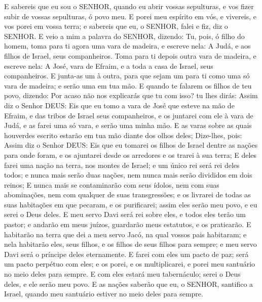 {  E sabereis que eu sou o SENHOR, quando eu abrir vossas sepulturas, e vos fizer subir de vossas sepulturas, ó povo meu.
  E porei meu espírito em vós, e vivereis, e vos porei em vossa terra; e sabereis que eu, o SENHOR, falei e fiz, diz o SENHOR.
  E veio a mim a palavra do SENHOR, dizendo:
  Tu, pois, ó filho do homem, toma para ti agora uma vara de madeira, e escreve nela: A Judá, e aos filhos de Israel, seus companheiros. Toma para ti depois outra vara de madeira, e escreve nela: A José, vara de Efraim, e a toda a casa de Israel, seus companheiros.
  E junta-as um à outra, para que sejam um para ti como uma só vara de madeira; e serão uma em tua mão.
  E quando te falarem os filhos de teu povo, dizendo: Por acaso não nos explicarás que tu
{} com isso?
   tu lhes dirás: Assim diz o Senhor DEUS: Eis que eu tomo a vara de José que esteve na mão de Efraim, e das tribos de Israel seus companheiros, e os juntarei com ele à vara de Judá, e as farei uma só vara, e serão uma minha mão.
  E as varas sobre as quais houverdes escrito estarão em tua mão diante dos olhos deles;
  Dize-lhes, pois: Assim diz o Senhor DEUS: Eis que eu tomarei os filhos de Israel dentre as nações para onde foram, e os ajuntarei desde os arredores e os trarei à sua
{} terra;
  E deles farei uma nação na terra, nos montes de Israel; e um único rei será rei deles todos; e nunca mais serão duas nações, nem nunca mais serão divididos em dois reinos;
  E nunca mais se contaminarão com seus ídolos, nem com suas abominações, nem com qualquer de suas transgressões; e os livrarei de todas as suas habitações em que pecaram, e os purificarei; assim eles serão meu povo, e eu serei o Deus deles.
  E meu servo Davi será rei sobre eles, e todos eles terão um
{} pastor; e andarão em meus juízos, guardarão meus estatutos, e os praticarão.
  E habitarão na terra que dei a meu servo Jacó, na qual vossos pais habitaram; e nela habitarão eles, seus filhos, e os filhos de seus filhos para sempre; e meu servo Davi será o príncipe deles eternamente.
  E farei com eles um pacto de paz; será um pacto perpétuo com eles; e os porei, e os multiplicarei, e porei meu santuário no meio deles para sempre.
  E com eles estará meu tabernáculo; serei o Deus deles, e ele serão meu povo.
  E as nações saberão que eu, o SENHOR, santifico a Israel, quando meu santuário estiver no meio deles para sempre.
\par }


